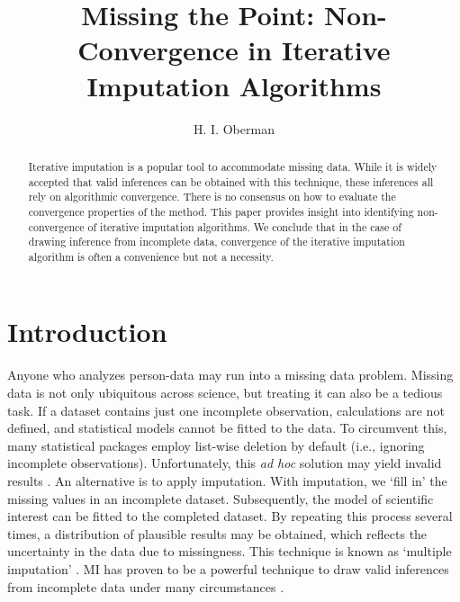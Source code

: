 \documentclass[Royal,times,sageh]{sagej}
\begin{document}
\title{Missing the Point: Non-Convergence in Iterative Imputation Algorithms}


\author{H. I. Oberman}




\begin{abstract}
Iterative imputation is a popular tool to accommodate missing data. While it is widely accepted that valid inferences can be obtained with this technique, these inferences all rely on algorithmic convergence. There is no consensus on how to evaluate the convergence properties of the method. This paper provides insight into identifying non-convergence of iterative imputation algorithms. We conclude that in the case of drawing inference from incomplete data, convergence of the iterative imputation algorithm is often a convenience but not a necessity.
\end{abstract}


\maketitle

\hypertarget{introduction}{%
\section{Introduction}\label{introduction}}

Anyone who analyzes person-data may run into a missing data problem. Missing data is not only ubiquitous across science, but treating it can also be a tedious task. If a dataset contains just one incomplete observation, calculations are not defined, and statistical models cannot be fitted to the data. To circumvent this, many statistical packages employ list-wise deletion by default (i.e., ignoring incomplete observations). Unfortunately, this \emph{ad hoc} solution may yield invalid results \citep{buur18}. An alternative is to apply imputation. With imputation, we `fill in' the missing values in an incomplete dataset. Subsequently, the model of scientific interest can be fitted to the completed dataset. By repeating this process several times, a distribution of plausible results may be obtained, which reflects the uncertainty in the data due to missingness. This technique is known as `multiple imputation' \citep[MI;][]{rubin76}. MI has proven to be a powerful technique to draw valid inferences from incomplete data under many circumstances \citep{buur18}.
\end{document}

